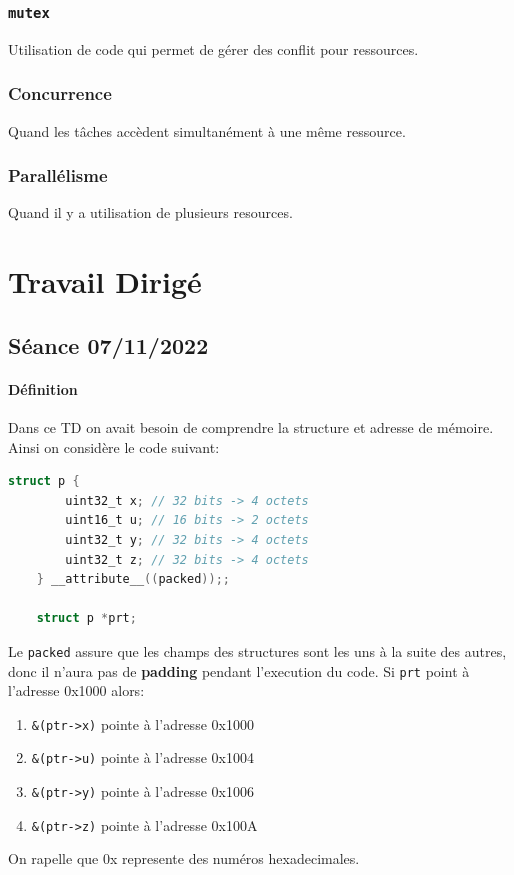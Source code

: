 \documentclass{article}
\begin{document}
\subsubsection{\texttt{mutex}}
\begin{definition}\label{def:mutex}
    Utilisation de code qui permet de gérer des conflit pour ressources. 
\end{definition}

\subsubsection{Concurrence}
\begin{definition}\label{def:concurrence}
    Quand les tâches accèdent simultanément à une même ressource.
\end{definition}

\subsubsection{Parallélisme}
\begin{definition}\label{def:parallelisme}
    Quand il y a utilisation de plusieurs resources.
\end{definition}


\section{Travail Dirigé}
\subsection{Séance 07/11/2022}
\paragraph{Définition}Dans ce TD on avait besoin de comprendre la structure et adresse de mémoire. Ainsi on considère le code suivant:
\begin{scriptsize}\mycode
    \begin{lstlisting}[language=C]
    struct p {
        uint32_t x; // 32 bits -> 4 octets
        uint16_t u; // 16 bits -> 2 octets
        uint32_t y; // 32 bits -> 4 octets
        uint32_t z; // 32 bits -> 4 octets
    } __attribute__((packed));;

    struct p *prt;
    \end{lstlisting}
\end{scriptsize}
Le \texttt{packed} assure que les champs des structures sont les uns à la suite des autres, donc il n'aura pas de \textbf{padding} pendant l'execution du code. Si \texttt{prt} point à l'adresse 0x1000 alors:
\begin{enumerate}[noitemsep]
    \item \texttt{\&(ptr->x)} pointe à l'adresse 0x1000
    \item \texttt{\&(ptr->u)} pointe à l'adresse 0x1004
    \item \texttt{\&(ptr->y)} pointe à l'adresse 0x1006
    \item \texttt{\&(ptr->z)} pointe à l'adresse 0x100A
\end{enumerate}
On rapelle que 0x represente des numéros hexadecimales.
\end{document}
